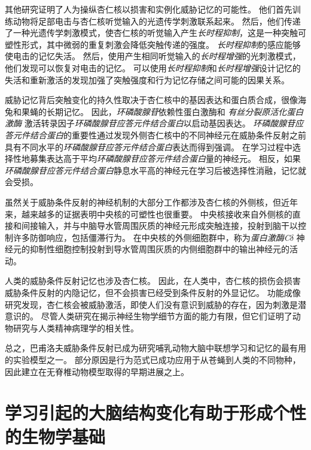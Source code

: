 其他研究证明了人为操纵杏仁核以损害和实例化威胁记忆的可能性。
他们首先训练动物将足部电击与杏仁核听觉输入的光遗传学刺激联系起来。
然后，他们传递了一种光遗传学刺激模式，使杏仁核的听觉输入产生\textit{长时程抑制}，这是一种突触可塑性形式，其中微弱的重复刺激会降低突触传递的强度。
\textit{长时程抑制}的感应能够使电击的记忆失活。
然后，使用产生相同听觉输入的\textit{长时程增强}的光刺激模式，他们发现可以恢复对电击的记忆。
可以使用\textit{长时程抑制}和\textit{长时程增强}设计记忆的失活和重新激活的发现加强了突触强度和行为记忆存储之间可能的因果关系。


威胁记忆背后突触变化的持久性取决于杏仁核中的基因表达和蛋白质合成，很像海兔和果蝇的长期记忆。
因此，\textit{环磷酸腺苷}依赖性蛋白激酶和 \textit{有丝分裂原活化蛋白激酶} 激活转录因子\textit{环磷酸腺苷应答元件结合蛋白}以启动基因表达。
\textit{环磷酸腺苷应答元件结合蛋白}的重要性通过发现外侧杏仁核中的不同神经元在威胁条件反射之前具有不同水平的\textit{环磷酸腺苷应答元件结合蛋白}表达而得到强调。
在学习过程中选择性地募集表达高于平均\textit{环磷酸腺苷应答元件结合蛋白}量的神经元。
相反，如果\textit{环磷酸腺苷应答元件结合蛋白}静息水平高的神经元在学习后被选择性消融，记忆就会受损。


虽然关于威胁条件反射的神经机制的大部分工作都涉及杏仁核的外侧核，但近年来，越来越多的证据表明中央核的可塑性也很重要。
中央核接收来自外侧核的直接和间接输入，并与中脑导水管周围灰质的神经元形成突触连接，投射到脑干以控制许多防御响应，包括僵滞行为。
在中央核的外侧细胞群中，称为\textit{蛋白激酶C}$ \delta $ 神经元的抑制性细胞控制投射到导水管周围灰质的内侧细胞群中的输出神经元的活动。


人类的威胁条件反射记忆也涉及杏仁核。
因此，在人类中，杏仁核的损伤会损害威胁条件反射的内隐记忆，但不会损害已经受到条件反射的外显记忆。
功能成像研究发现，杏仁核会被威胁激活，即使人们没有意识到威胁的存在，因为刺激是潜意识的。
尽管人类研究在揭示神经生物学细节方面的能力有限，但它们证明了动物研究与人类精神病理学的相关性。


总之，巴甫洛夫威胁条件反射已成为研究哺乳动物大脑中联想学习和记忆的最有用的实验模型之一。
部分原因是行为范式已成功应用于从苍蝇到人类的不同物种，因此建立在无脊椎动物模型取得的早期进展之上。



\section{学习引起的大脑结构变化有助于形成个性的生物学基础}

